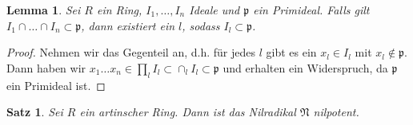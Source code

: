 \documentclass[reqno,12pt]{article}
\numberwithin{equation}{section}
\theoremstyle{plain}
\newtheorem{lemma}[thm]{Lemma}
\newtheorem{proposition}[thm]{Satz}
\theoremstyle{definition}
\begin{document}
\begin{lemma}\label{lemma-intersection-lies-in-prime-ideal}
Sei $R$ ein Ring, $I_1, \dots, I_n$ Ideale und $\mathfrak{p}$ ein Primideal. Falls gilt $I_1 \cap \dots \cap I_n \subset \mathfrak{p}$, dann existiert ein $l$, sodass $I_l \subset \mathfrak{p}$.
\end{lemma}

\begin{proof}
Nehmen wir das Gegenteil an, d.h. für jedes $l$ gibt es ein $x_l \in I_l$ mit $x_l \notin \mathfrak{p}$. Dann haben wir $x_1 \dots x_n \in \prod_l I_l \subset \cap_l I_l \subset \mathfrak{p}$ und erhalten ein Widerspruch, da $\mathfrak{p}$ ein Primideal ist.
\end{proof}



\begin{proposition}\label{proposition-artinian-radical-nilpotent}
Sei $R$ ein artinscher Ring. Dann ist das Nilradikal $\mathfrak{N}$ nilpotent.
\end{proposition}



\newpage


\end{document}
